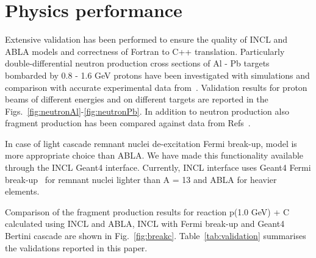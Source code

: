\documentclass[a4paper]{jpconf}
\begin{document}

\section{Physics performance}\label{sec:performance}
Extensive validation has been performed to ensure the quality of INCL and ABLA models and correctness
of Fortran to C++ translation. 
Particularly double-differential neutron production cross sections of
Al - Pb targets bombarded by 0.8 - 1.6 GeV protons have been
investigated with simulations and comparison with accurate experimental data from~\cite{data}.
Validation results for proton beams of different energies 
and on different targets are reported in the Figs.~\ref{fig:neutronAl}-\ref{fig:neutronPb}.
In addition to neutron production also fragment production has been
compared against data from Refs~\cite{gsifragments, carbone}.


In case of light cascade remnant nuclei de-excitation Fermi break-up,
model is more appropriate choice than ABLA.
We have made this functionality available through the INCL Geant4 interface.
Currently, INCL interface uses Geant4 Fermi break-up~\cite{g4fermi} for
remnant nuclei lighter than A = 13 and ABLA for heavier elements.


Comparison of the fragment production results for reaction p(1.0 GeV) + C 
calculated using INCL and ABLA, INCL with Fermi break-up and
Geant4 Bertini cascade are shown in Fig.~\ref{fig:breakc}.
Table~\ref{tab:validation} summarises the validations reported in this paper.
\end{document}

